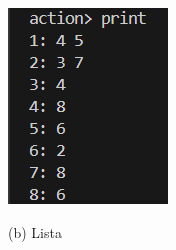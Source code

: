\documentclass{article}
\begin{document}
\begin{figure}[htbp]
\begin{minipage}[b]{0.3\textwidth}
		\end{minipage}
		\hfill
		\begin{minipage}[b]{0.3\textwidth}
			\centering
			\includegraphics[width=\textwidth]{reprezentacja_list_k.png}
			\par\small (b) Lista
		\end{minipage}
		\hfill
		\begin{minipage}[b]{0.3\textwidth}
			\centering

\end{minipage}
\end{figure}
\end{document}
